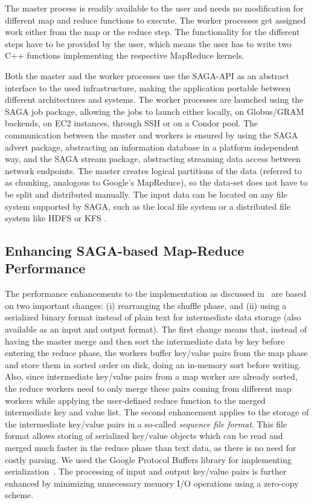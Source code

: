 \documentclass[3p,twocolumn]{elsarticle}
\begin{document}
The master process is readily available to the user and needs no
modification for different map and reduce functions to execute.  The
worker processes get assigned work either from the map or the reduce
step. The functionality for the different steps have to be provided by
the user, which means the user has to write two C++ functions
implementing the respective MapReduce kernels.

Both the master and the worker processes use the SAGA-API as an
abstract interface to the used infrastructure, making the application
portable between different architectures and systems.  The worker
processes are launched using the SAGA job package, allowing the jobs
to launch either locally, on Globus/GRAM backends, on EC2 instances, through SSH
or on a Condor pool. The communication between the master and workers
is ensured by using the SAGA advert package, abstracting an
information database in a platform independent way, and the SAGA stream
package, abstracting streaming data access between network endpoints.
The master creates logical partitions of the data (referred to as chunking,
analogous to Google's MapReduce), so the data-set does not have to be split
and distributed manually.  The input data can be located on any file system
supported by SAGA, such as the local file system or a distributed file system
like HDFS or KFS \cite{KFS}.


\subsection{Enhancing SAGA-based Map-Reduce Performance}

The performance enhancements to the \sagamapreduce implementation as
discussed in~\cite{saga_ccgrid09} are based on two important changes:
(i) rearranging the shuffle phase, and (ii) using a serialized binary
format instead of plain text for intermediate data storage (also
available as an input and output format).  The first change means
that, instead of having the master merge and then sort the
intermediate data by key before entering the reduce phase, the workers
buffer key/value pairs from the map phase and store them in sorted
order on disk, doing an in-memory sort before writing. Also, since
intermediate key/value pairs from a map worker are already sorted, the
reduce workers need to only merge these pairs coming from different
map workers while applying the user-defined reduce function to the
merged intermediate key and value list.  The second enhancement
applies to the storage of the intermediate key/value pairs in a
so-called \emph{sequence file format}. This file format allows storing
of serialized key/value objects which can be read and merged much
faster in the reduce phase than text data, as there is no need for
costly parsing.  We used the Google Protocol Buffers library for
implementing serialization~\cite{protobuf}.  The processing of input
and output key/value pairs is further enhanced by minimizing
unnecessary memory I/O operations using a zero-copy scheme.
\end{document}
